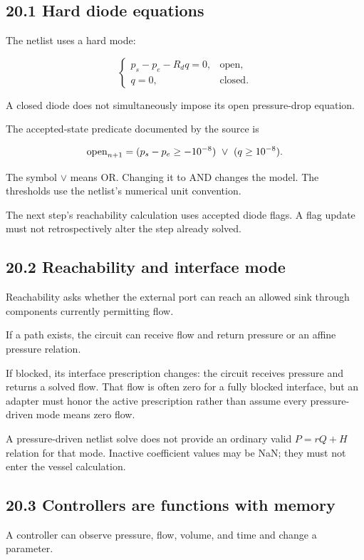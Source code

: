\documentclass[11pt,a4paper]{article}
\begin{document}
\subsection{20.1 Hard diode equations}
The netlist uses a hard mode:


\begingroup\small
\[
\begin{cases}
p_s-p_e-R_dq=0,&\text{open},\\
q=0,&\text{closed}.
\end{cases}
\]
\endgroup


A closed diode does not simultaneously impose its open pressure-drop equation.

The accepted-state predicate documented by the source is


\begingroup\small
\[
{\rm open}_{n+1}
=
(p_s-p_e\geq-10^{-8})
\ \lor\
(q\geq10^{-8}).
\]
\endgroup


The symbol \(\lor\) means OR. Changing it to AND changes the model. The thresholds use the netlist's numerical unit convention.

The next step's reachability calculation uses accepted diode flags. A flag update must not retrospectively alter the step already solved.

\subsection{20.2 Reachability and interface mode}
Reachability asks whether the external port can reach an allowed sink through components currently permitting flow.

If a path exists, the circuit can receive flow and return pressure or an affine pressure relation.

If blocked, its interface prescription changes: the circuit receives pressure and returns a solved flow. That flow is often zero for a fully blocked interface, but an adapter must honor the active prescription rather than assume every pressure-driven mode means zero flow.

A pressure-driven netlist solve does not provide an ordinary valid \(P=rQ+H\) relation for that mode. Inactive coefficient values may be NaN; they must not enter the vessel calculation.

\subsection{20.3 Controllers are functions with memory}
A controller can observe pressure, flow, volume, and time and change a parameter.
\end{document}
